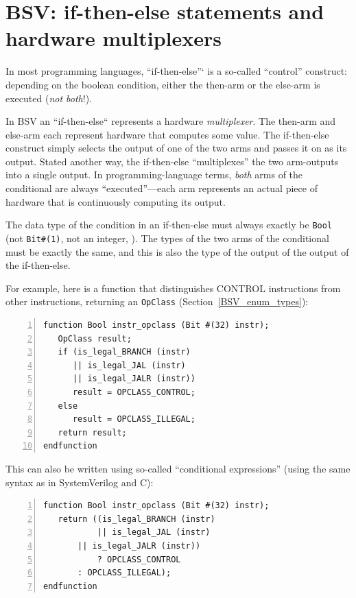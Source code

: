 
\section{BSV: if-then-else statements and hardware multiplexers}

\label{BSV_if_then_else}


In most programming languages, ``if-then-else''` is a so-called
``control'' construct: depending on the boolean condition, either the
then-arm or the else-arm is executed (\emph{not both}!).

In BSV an ``if-then-else`` represents a hardware \emph{multiplexer}.
The then-arm and else-arm each represent hardware that computes some
value.  The if-then-else construct simply selects the output of one of
the two arms and passes it on as its output.  Stated another way, the
if-then-else ``multiplexes'' the two arm-outputs into a single output.
In programming-language terms, \emph{both} arms of the conditional are
always ``executed''---each arm represents an actual piece of hardware
that is continuously computing its output.

The data type of the condition in an if-then-else must always exactly
be \verb|Bool| (not \verb|Bit#(1)|, not an integer, {\etc}).  The
types of the two arms of the conditional must be exactly the same, and
this is also the type of the output of the output of the if-then-else.

For example, here is a function that distinguishes CONTROL
instructions from other instructions, returning an \verb|OpClass|
(Section~\ref{BSV_enum_types}):

\begin{Verbatim}[frame=single, numbers=left]
function Bool instr_opclass (Bit #(32) instr);
   OpClass result;
   if (is_legal_BRANCH (instr)
      || is_legal_JAL (instr)
      || is_legal_JALR (instr))
      result = OPCLASS_CONTROL;
   else
      result = OPCLASS_ILLEGAL;
   return result;
endfunction
\end{Verbatim}

This can also be written using so-called ``conditional expressions''
(using the same syntax as in SystemVerilog and C):

\begin{Verbatim}[frame=single, numbers=left]
function Bool instr_opclass (Bit #(32) instr);
   return ((is_legal_BRANCH (instr)
           || is_legal_JAL (instr)
	   || is_legal_JALR (instr))
           ? OPCLASS_CONTROL
	   : OPCLASS_ILLEGAL);
endfunction
\end{Verbatim}

